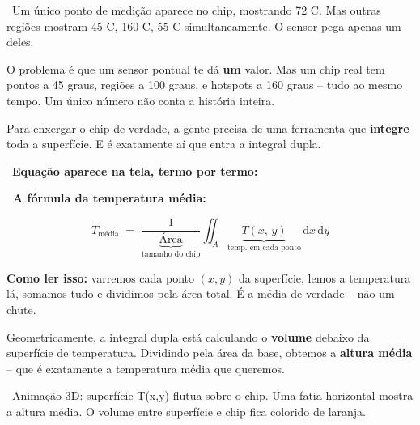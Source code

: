 \documentclass[12pt, a4paper]{article}
\begin{document}
\begin{visual}
\faFilm\ Um único ponto de medição aparece no chip, mostrando 72 {\textdegree}C.
Mas outras regiões mostram 45 {\textdegree}C, 160 {\textdegree}C, 55 {\textdegree}C simultaneamente.
O sensor pega apenas um deles.
\end{visual}

\begin{fala}
O problema é que um sensor pontual te dá \textbf{um} valor. Mas um chip real
tem pontos a 45 graus, regiões a 100 graus, e hotspots a 160 graus --
tudo ao mesmo tempo. Um único número não conta a história inteira.
\end{fala}

\begin{fala}
Para enxergar o chip de verdade, a gente precisa de uma ferramenta que
\textbf{integre} toda a superfície. E é exatamente aí que entra a integral dupla.
\end{fala}

\begin{tela}
\faDesktop\ \textbf{Equação aparece na tela, termo por termo:}
\end{tela}

\begin{mathblock}
\textbf{\color{corMath}\faSuperscript\ A fórmula da temperatura média:}

\vspace{6pt}
\[
  T_{\text{média}}
  \;=\;
  \frac{1}{\underbrace{\text{Área}}_{\text{tamanho do chip}}}
  \iint_{A}
  \underbrace{T(x,\,y)}_{\text{temp.\ em cada ponto}}
  \,\mathrm{d}x\,\mathrm{d}y
\]

\vspace{4pt}
{\small\color{gray}
\textbf{Como ler isso:} varremos cada ponto $(x,y)$ da superfície, lemos a temperatura
lá, somamos tudo e dividimos pela área total. É a média de verdade -- não um chute.}
\end{mathblock}

\begin{fala}
Geometricamente, a integral dupla está calculando o \textbf{volume} debaixo
da superfície de temperatura. Dividindo pela área da base, obtemos a
\textbf{altura média} -- que é exatamente a temperatura média que queremos.
\end{fala}

\begin{visual}
\faFilm\ Animação 3D: superfície T(x,y) flutua sobre o chip. Uma fatia horizontal
mostra a altura média. O volume entre superfície e chip fica colorido de laranja.
\end{visual}
\end{document}
